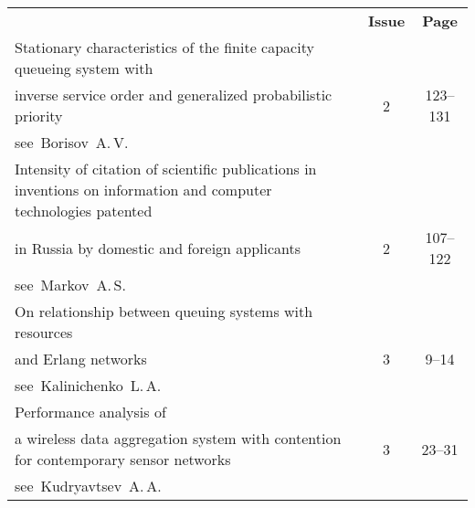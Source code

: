 \def\leftfootline{\small{\textbf{\thepage}
\hfill INFORMATIKA I EE PRIMENENIYA~--- INFORMATICS AND APPLICATIONS\ \ \ 2016\
\ \ volume~10\ \ \ issue\ 4}
}%
 \def\rightfootline{\small{INFORMATIKA I EE PRIMENENIYA~---
INFORMATICS AND APPLICATIONS\ \ \ 2016\ \ \ volume~10\ \ \ issue\ 4
\hfill \textbf{\thepage}}}

\def\leftkol{2016 AUTHOR INDEX} %

\def\rightkol{2016 AUTHOR INDEX} %


{\tabcolsep=3pt
\begin{tabular}{p{381pt}cc}
&\textbf{Issue} & \textbf{Page}\\[6pt]
\Avtors{Meykhanadzhyan~L.\,A.} Stationary characteristics of the finite
capacity queueing system with\linebreak
\\[-12pt]
\hspace*{23pt}inverse service order and generalized
probabilistic priority&2&123--131\\[.23pt]
\Avtors{Miller~G.\,B.} see~Borisov~A.\,V.&&\\[.23pt]
\Avtors{Minin~V.\,A., Zatsman~I.\,M., Havanskov~V.\,A., and
Shubnikov~S.\,K.} Intensity of citation of scientific publications in
inventions on information and computer technologies patented\linebreak
\\[-12pt]
\hspace*{23pt}in Russia by domestic and foreign applicants&2&107--122\\[.23pt]
\Avtors{Monakhov~M.\,M.} see~Markov~A.\,S.&&\\[.23pt]
\Avtors{Naumov~V.\,A.\ and Samouylov~K.\,E.} On relationship
between queuing systems with resources\linebreak
\\[-12pt]
\hspace*{23pt}and Erlang networks&3&\hphantom{1}9--14\\[.23pt]
\Avtors{Okladnikov~I.\,G.} see~Kalinichenko~L.\,A.&&\\[.23pt]
\Avtors{Ometov~A.\,Ya., Andreev~S.\,D., Turlikov~A.\,M., and
Koucheryavy~E.\,A.} Performance analysis of\linebreak
\\[-12pt]
\hspace*{23pt}a wireless data
aggregation system with contention for contemporary sensor
networks&3&23--31\\[.23pt]
\Avtors{Palionnaia~S.\,I.} see~Kudryavtsev~A.\,A.&&\\[.23pt]

\end{tabular}}
